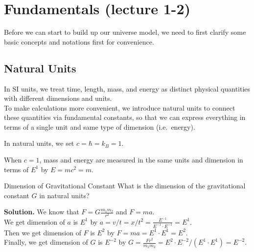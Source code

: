 
\chapter{Fundamentals (lecture 1-2)}
Before we can start to build up our universe model, we need to first clarify some basic concepts and notations first for convenience. \\
\section{Natural Units}

\begin{intuition}
In SI units, we treat time, length, mass, and energy as distinct physical quantities with different dimensions and units. \\

To make calculations more convenient, we introduce natural units to connect these quantities via fundamental constants,
so that we can express everything in terms of a single unit and same type of dimension (i.e.\ energy).
\end{intuition}

\begin{theory}
In natural units, we set $c = \hbar = k_B = 1$.

When $c=1$, mass and energy are measured in the same units and dimension in terms of $E^1$ by $ E = mc^2 = m $.
\end{theory}

\bigskip
\begin{example}{Dimension of Gravitational Constant}{}
What is the dimension of the gravitational constant $G$ in natural units?

\bigskip\textbf{Solution.}\quad
We know that $F = G \frac{m_1 m_2}{r^2}$ and $F = ma$. \\
We get dimension of $a$ is $E^1$ by $a = v/t = x/t^2 = \frac{E^{-1}}{E^{-1}\cdot E^{-1}} = E^1$. \\
Then we get dimension of $F$ is $E^2$ by $F = ma = E^1 \cdot E^1 = E^2$. \\
Finally, we get dimension of $G$ is $E^{-2}$ by $G = \frac{F r^2}{m_1 m_2} = E^2 \cdot E^{-2} / (E^1 \cdot E^1) = E^{-2}$.

\end{example}


